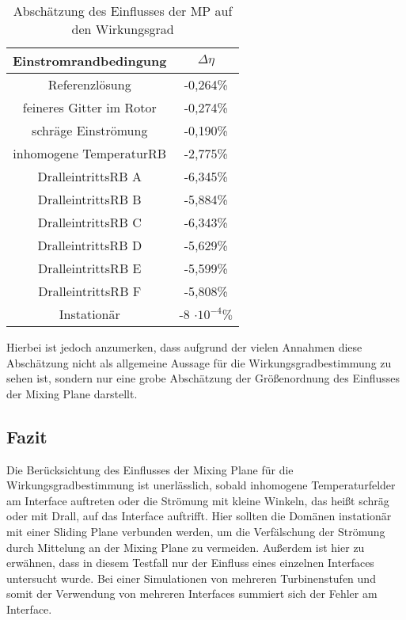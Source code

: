 \begin{table}[htbp]
\centering
\caption{Abschätzung des Einflusses der MP auf den Wirkungsgrad}
\begin{tabular}{ c| c}
Einstromrandbedingung&$\Delta \eta$\\
\toprule
Referenzlösung&-0,264\%\\
feineres Gitter im Rotor&-0,274\%\\
schräge Einströmung&-0,190\% \\
inhomogene TemperaturRB&-2,775\% \\
DralleintrittsRB A&-6,345\% \\
DralleintrittsRB B&-5,884\% \\
DralleintrittsRB C&-6,343\% \\
DralleintrittsRB D&-5,629\% \\
DralleintrittsRB E&-5,599\% \\
DralleintrittsRB F&-5,808\% \\
\midrule
Instationär&-8 $\cdot 10^{-4}\%$ \\
\end{tabular}
\label{tab:kanalwg}
\end{table}
Hierbei ist jedoch anzumerken, dass aufgrund der vielen Annahmen diese Abschätzung nicht als allgemeine Aussage für die Wirkungsgradbestimmung zu sehen ist, sondern nur eine grobe Abschätzung der Größenordnung des Einflusses der Mixing Plane darstellt.

\newpage
\subsection{Fazit}
\label{subsec:fazit}
Die Berücksichtung des Einflusses der Mixing Plane für die Wirkungsgradbestimmung ist unerlässlich, sobald inhomogene Temperaturfelder am Interface auftreten oder die Strömung mit kleine Winkeln, das heißt schräg oder mit Drall, auf das Interface auftrifft. Hier sollten die Domänen instationär mit einer Sliding Plane verbunden werden, um die Verfälschung der Strömung durch Mittelung an der Mixing Plane zu vermeiden. Außerdem ist hier zu erwähnen, dass in diesem Testfall nur der Einfluss eines einzelnen Interfaces untersucht wurde. Bei einer Simulationen von mehreren Turbinenstufen und somit der Verwendung von mehreren Interfaces summiert sich der Fehler am Interface.



